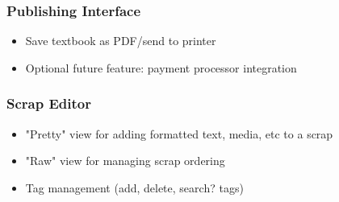 \documentclass[letterpaper, 10pt, draftclsnofoot, compsoc, onecolumn]{IEEEtran}
\begin{document}
{{\subsubsection[System feature 5: Publishing Interface]{\rmfamily\bfseries\color{black} Publishing Interface}
\begin{itemize}
\item Save textbook as PDF/send to printer
\item Optional future feature: payment processor integration
\end{itemize}

\subsubsection[System feature 6: Scrap Editor]{\rmfamily\bfseries\color{black} Scrap Editor}
\begin{itemize}
\item "Pretty" view for adding formatted text, media, etc to a scrap
\item "Raw" view for managing scrap ordering
\item Tag management (add, delete, search? tags)
\end{itemize}

\bigskip


}}
\end{document}
